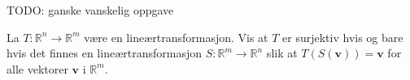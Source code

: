 \documentclass[titlepage,a4paper,12pt,norsk]{IMFeksamen}
\newcommand{\R}{\mathbb{R}}
\newcommand{\V}[1]{\mathbf{#1}}
\renewcommand{\v}{\V{v}}
\newcommand{\0}{\V{0}}
\begin{document}
\begin{oppgave}
TODO: ganske vanskelig oppgave
\end{oppgave}


\begin{oppgave}
La $T \colon \R^n \to \R^m$ være en lineærtransformasjon.
Vis at $T$ er surjektiv hvis og bare hvis det finnes en
lineærtransformasjon $S \colon \R^m \to \R^n$ slik at
$T(S(\v)) = \v$ for alle vektorer $\v$ i $\R^m$.
\end{oppgave}
\end{document}
